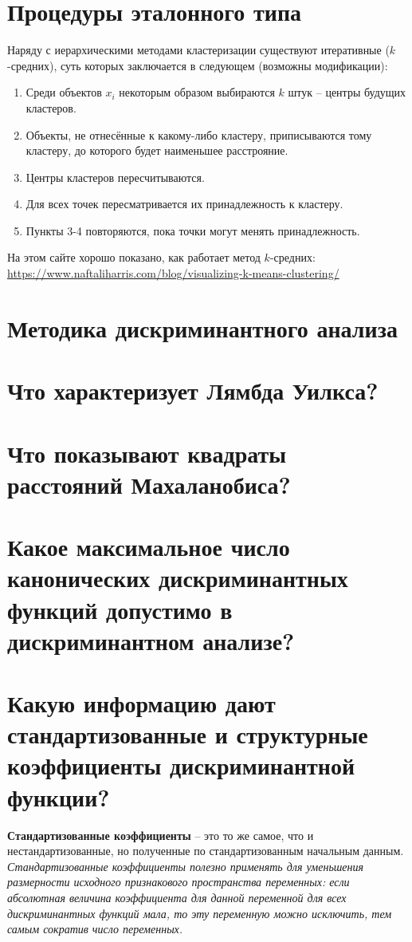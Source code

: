 \documentclass[a4paper, 12pt]{article}
\begin{document}
\section{Процедуры эталонного типа}
Наряду с иерархическими методами кластеризации существуют итеративные ($k$-средних), суть которых заключается в следующем (возможны модификации):
\begin{enumerate}
    \item Среди объектов $x_i$ некоторым образом выбираются $k$ штук -- центры будущих кластеров.
    \item Объекты, не отнесённые к какому-либо кластеру, приписываются тому кластеру, до которого будет наименьшее расстрояние.
    \item Центры кластеров пересчитываются.
    \item Для всех точек пересматривается их принадлежность к кластеру.
    \item Пункты 3-4 повторяются, пока точки могут менять принадлежность.
\end{enumerate}
На этом сайте хорошо показано, как работает метод $k$-средних: \url{https://www.naftaliharris.com/blog/visualizing-k-means-clustering/}

\section{Методика дискриминантного анализа}
\section{Что характеризует Лямбда Уилкса?}
\section{Что показывают квадраты расстояний Махаланобиса?}
\section{Какое максимальное число канонических дискриминантных функций допустимо в дискриминантном анализе?}
\section{Какую информацию дают стандартизованные и структурные коэффициенты дискриминантной функции?}
 \textbf{Стандартизованные коэффициенты}  -- это то же самое, что и нестандартизованные, но полученные по стандартизованным начальным данным. \textit{Стандартизованные коэффициенты полезно применять для уменьшения размерности исходного признакового пространства переменных: если абсолютная величина коэффициента для данной переменной для всех дискриминантных функций мала, то эту переменную можно исключить, тем самым сократив число переменных.} 
\end{document}
